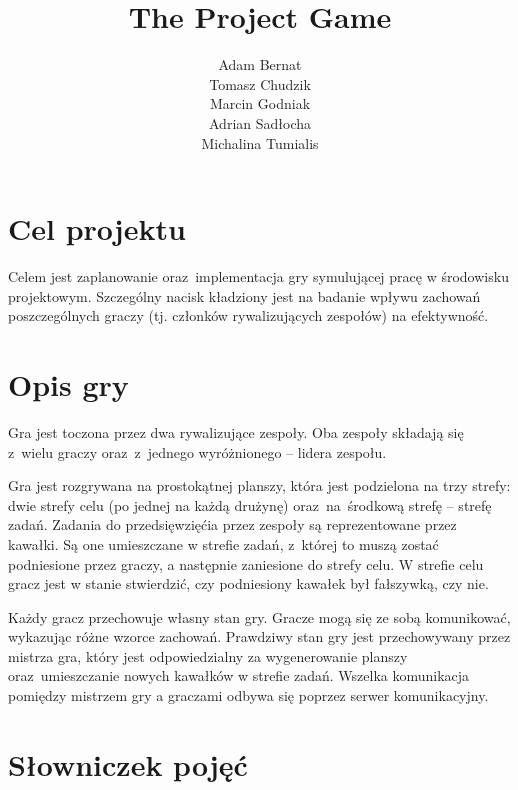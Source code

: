 \documentclass[a4paper]{article}
\title{The Project Game}
\author{
Adam Bernat \\
Tomasz Chudzik \\
Marcin Godniak \\
Adrian Sadłocha \\
Michalina Tumialis
}
\begin{document}
\maketitle
\setcounter{secnumdepth}{2}
\setcounter{tocdepth}{2}
\tableofcontents
\newpage


\section{Cel projektu}

Celem jest zaplanowanie oraz~implementacja gry symulującej pracę w środowisku projektowym.
Szczególny nacisk kładziony jest na badanie wpływu zachowań poszczególnych graczy (tj. członków rywalizujących zespołów) na efektywność.

\section{Opis gry}

Gra jest toczona przez dwa rywalizujące zespoły.
Oba zespoły składają się z~wielu graczy oraz~z~jednego wyróżnionego -- lidera zespołu.

Gra jest rozgrywana na prostokątnej planszy, która jest podzielona na trzy strefy: dwie strefy celu (po jednej na każdą drużynę) oraz~na~środkową strefę -- strefę zadań.
Zadania do przedsięwzięćia przez zespoły są reprezentowane przez kawałki.
Są one umieszczane w strefie zadań, z~której to muszą zostać podniesione przez graczy, a następnie zaniesione do strefy celu.
W strefie celu gracz jest w stanie stwierdzić, czy podniesiony kawałek był fałszywką, czy nie.

Każdy gracz przechowuje własny stan gry.
Gracze mogą się ze sobą komunikować, wykazując różne wzorce zachowań.
Prawdziwy stan gry jest przechowywany przez mistrza gra, który jest odpowiedzialny za wygenerowanie planszy oraz~umieszczanie nowych kawałków w strefie zadań.
Wszelka komunikacja pomiędzy mistrzem gry a graczami odbywa się poprzez serwer komunikacyjny.

\section{Słowniczek pojęć}
\end{document}
